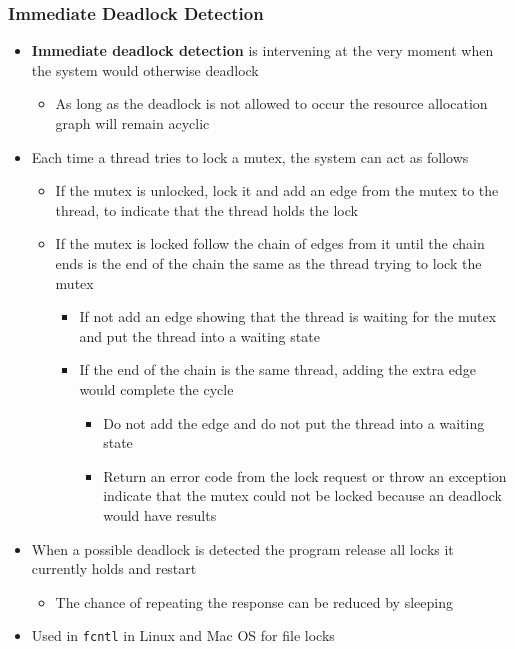 \documentclass[11pt]{article}
\providecommand{\tightlist}{%
      \setlength{\itemsep}{0pt}\setlength{\parskip}{0pt}}
\begin{document}
    \subsubsection{Immediate Deadlock
Detection}\label{immediate-deadlock-detection}

\begin{itemize}
\tightlist
\item
  \textbf{Immediate deadlock detection} is intervening at the very
  moment when the system would otherwise deadlock

  \begin{itemize}
  \tightlist
  \item
    As long as the deadlock is not allowed to occur the resource
    allocation graph will remain acyclic
  \end{itemize}
\item
  Each time a thread tries to lock a mutex, the system can act as
  follows

  \begin{itemize}
  \tightlist
  \item
    If the mutex is unlocked, lock it and add an edge from the mutex to
    the thread, to indicate that the thread holds the lock
  \item
    If the mutex is locked follow the chain of edges from it until the
    chain ends is the end of the chain the same as the thread trying to
    lock the mutex

    \begin{itemize}
    \tightlist
    \item
      If not add an edge showing that the thread is waiting for the
      mutex and put the thread into a waiting state
    \item
      If the end of the chain is the same thread, adding the extra edge
      would complete the cycle

      \begin{itemize}
      \tightlist
      \item
        Do not add the edge and do not put the thread into a waiting
        state
      \item
        Return an error code from the lock request or throw an exception
        indicate that the mutex could not be locked because an deadlock
        would have results
      \end{itemize}
    \end{itemize}
  \end{itemize}
\item
  When a possible deadlock is detected the program release all locks it
  currently holds and restart

  \begin{itemize}
  \tightlist
  \item
    The chance of repeating the response can be reduced by sleeping
  \end{itemize}
\item
  Used in \texttt{fcntl} in Linux and Mac OS for file locks
\end{itemize}
\end{document}
